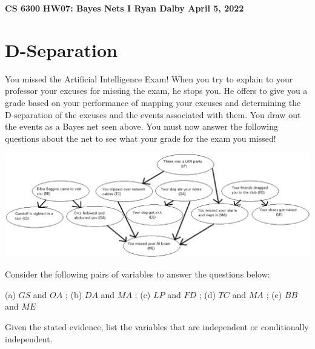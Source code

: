 \documentclass[12pt]{article}
\begin{document}
\begin{center}
{\bf CS 6300} \hfill {\large\bf HW07: Bayes Nets I \hfill {\bf Ryan Dalby} \hfill April 5, 2022}
\end{center}

\section{D-Separation}

You missed the Artificial Intelligence Exam! When you try to explain to your professor your excuses for 
missing the exam, he stops you.  He offers to give you a grade based on your performance of mapping
your excuses and determining the D-separation of the excuses and the events associated with them. 
You draw out the events as a Bayes net seen above.  You must now answer the following questions
about the net to see what your grade for the exam you missed!

\begin{center}
\includegraphics[width=1.0\textwidth]{excuses.eps}
\end{center}

\noindent 
Consider the following pairs of variables to answer the questions below:
\newline\newline
\centerline{(a) $GS$ and $OA$  ;  (b) $DA$ and $MA$  ;  (c) $LP$ and $FD$  ;  (d) $TC$ and $MA$  ;  (e) $BB$ and $ME$}

Given the stated evidence, list the variables that are independent or conditionally independent.
\end{document}
